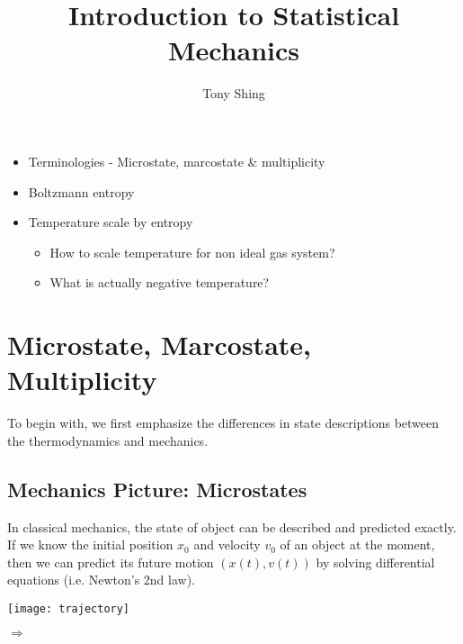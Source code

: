 \documentclass[class=article, crop=false, 12pt]{standalone}
\author{Tony Shing}
\title{Introduction to Statistical Mechanics}
\begin{document}
\maketitle


\begin{overview}
    \begin{itemize}
        \item Terminologies - Microstate, marcostate \& multiplicity
        \item Boltzmann entropy
        \item Temperature scale by entropy
        \begin{itemize}
            \item How to scale temperature for non ideal gas system?
            \item What is actually negative temperature?
        \end{itemize}
    \end{itemize}
\end{overview}




\section{Microstate, Marcostate, Multiplicity}

To begin with,
we first emphasize the differences in state descriptions between the thermodynamics and mechanics.


\subsection{Mechanics Picture: Microstates}

In classical mechanics, 
the state of object can be described and predicted exactly. 
If we know the initial position $x_0$ and velocity $v_0$ of an object at the moment, 
then we can predict its future motion $(x(t), v(t))$ by solving differential equations 
(i.e. Newton's 2nd law). 
\begin{center}
    \begin{minipage}{0.25\linewidth}
        \centering
        \texttt{[image: trajectory]}
    \end{minipage}
    \qquad$\Rightarrow$\qquad
    \begin{minipage}{0.2\linewidth}
    \end{minipage}
\end{center}
\end{document}
